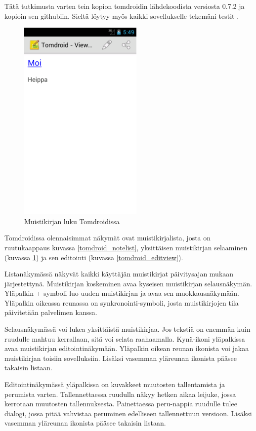 Tätä tutkimusta varten tein kopion tomdroidin lähdekoodista versiosta 0.7.2 ja kopioin sen githubiin. Sieltä löytyy myös kaikki sovellukselle tekemäni testit \cite{tomdroid_github}.

\begin{figure}[htb]
\includegraphics[width=60mm]{tomdroid_noteview.png}
\caption{Muistikirjan luku Tomdroidissa} \label{tomdroid_noteview}
\end{figure}

Tomdroidissa olennaisimmat näkymät ovat muistikirjalista, josta on ruutukaappaus kuvassa \ref{tomdroid_notelist}, yksittäisen muistikirjan selaaminen (kuvassa \ref{tomdroid_noteview}) ja sen editointi (kuvassa \ref{tomdroid_editview}). 

Listanäkymässä näkyvät kaikki käyttäjän muistikirjat päivitysajan mukaan järjestettynä. Muistikirjan koskeminen avaa kyseisen muistikirjan selausnäkymän. Yläpalkin +-symboli luo uuden muistikirjan ja avaa sen muokkausnäkymään. Yläpalkin oikeassa reunassa on synkronointi-symboli, josta muistikirjojen tila päivitetään palvelimen kanssa.

Selausnäkymässä voi lukea yksittäistä muistikirjaa. Jos tekstiä on enemmän kuin ruudulle mahtuu kerrallaan, sitä voi selata raahaamalla. Kynä-ikoni yläpalkissa avaa muistikirjan editointinäkymään. Yläpalkin oikean reunan ikonista voi jakaa muistikirjan toisiin sovelluksiin. Lisäksi vasemman yläreunan ikonista pääsee takaisin listaan.

Editointinäkymässä yläpalkissa on kuvakkeet muutosten tallentamista ja perumista varten. Tallennettaessa ruudulla näkyy hetken aikaa leijuke, jossa kerrotaan muutosten tallennuksesta. Painettaessa peru-nappia ruudulle tulee dialogi, jossa pitää vahvistaa peruminen edelliseen tallennettuun versioon. Lisäksi vasemman yläreunan ikonista pääsee takaisin listaan.

